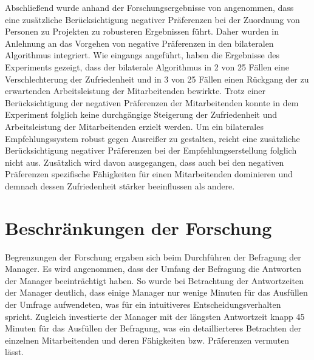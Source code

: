 Abschließend wurde anhand der Forschungsergebnisse von \textcite[S. 1ff.]{link:booklet} angenommen, dass eine zusätzliche Berücksichtigung negativer Präferenzen bei der Zuordnung von Personen zu Projekten zu robusteren Ergebnissen führt.
Daher wurden in Anlehnung an das Vorgehen von \textcite[S. 269ff.]{pizzato:2:inproceedings} negative Präferenzen in den bilateralen Algorithmus integriert.
Wie eingangs angeführt, haben die Ergebnisse des Experiments gezeigt, dass der bilaterale Algorithmus in 2 von 25 Fällen eine Verschlechterung der Zufriedenheit und in 3 von 25 Fällen einen Rückgang der zu erwartenden Arbeitsleistung der Mitarbeitenden bewirkte.
Trotz einer Berücksichtigung der negativen Präferenzen der Mitarbeitenden konnte in dem Experiment folglich keine durchgängige Steigerung der Zufriedenheit und Arbeitsleistung der Mitarbeitenden erzielt werden. 
Um ein bilaterales Empfehlungssystem robust gegen Ausreißer zu gestalten, reicht eine zusätzliche Berücksichtigung negativer Präferenzen bei der Empfehlungserstellung folglich nicht aus.
Zusätzlich wird davon ausgegangen, dass auch bei den negativen Präferenzen spezifische Fähigkeiten für einen Mitarbeitenden dominieren und demnach dessen Zufriedenheit stärker beeinflussen als andere.


\section{Beschränkungen der Forschung}
Begrenzungen der Forschung ergaben sich beim Durchführen der Befragung der Manager.
Es wird angenommen, dass der Umfang der Befragung die Antworten der Manager beeinträchtigt haben.
So wurde bei Betrachtung der Antwortzeiten der Manager deutlich, dass einige Manager nur wenige Minuten für das Ausfüllen der Umfrage aufwendeten, was für ein intuitiveres Entscheidungsverhalten spricht.
Zugleich investierte der Manager mit der längsten Antwortzeit knapp 45 Minuten für das Ausfüllen der Befragung, was ein detaillierteres Betrachten der einzelnen Mitarbeitenden und deren Fähigkeiten bzw. Präferenzen vermuten lässt.

